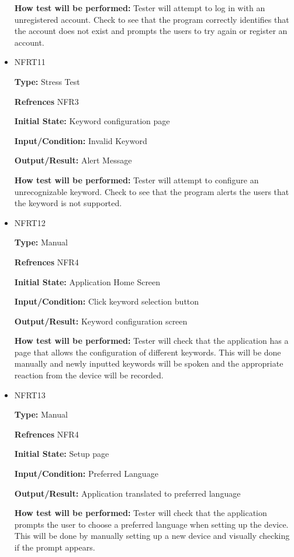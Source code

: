 \documentclass[12pt, titlepage]{article}
\begin{document}
\begin{itemize}
\textbf{How test will be performed:} Tester will attempt to log in with an unregistered account. Check to see that the program correctly identifies that the account does not exist and prompts the users to try again or register an account.

\item{NFRT11}

\textbf{Type:} Stress Test

\textbf{Refrences} NFR3
					
\textbf{Initial State:} Keyword configuration page
					
\textbf{Input/Condition:} Invalid Keyword
					
\textbf{Output/Result:} Alert Message
					
\textbf{How test will be performed:} Tester will attempt to configure an unrecognizable keyword. Check to see that the program alerts the users that the keyword is not supported. 

\item{NFRT12} 

\textbf{Type:} Manual

\textbf{Refrences} NFR4
					
\textbf{Initial State:} Application Home Screen
					
\textbf{Input/Condition:} Click keyword selection button
					
\textbf{Output/Result:} Keyword configuration screen
					
\textbf{How test will be performed:} Tester will check that the application has a page that allows the configuration of different keywords. This will be done manually and newly inputted keywords will be spoken and the appropriate reaction from the device will be recorded. 

\item{NFRT13}

\textbf{Type:} Manual

\textbf{Refrences} NFR4
					
\textbf{Initial State:} Setup page
					
\textbf{Input/Condition:} Preferred Language
					
\textbf{Output/Result:} Application translated to preferred language
					
\textbf{How test will be performed:} Tester will check that the application prompts the user to choose a preferred language when setting up the device. This will be done by manually setting up a new device and visually checking if the prompt appears.


\end{itemize}
\end{document}

